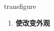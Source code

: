 
\begin{frame}
{\huge transfigure}
\begin{center}
\begin{enumerate}\Large
  \item \textbf{使改变外观}
\end{enumerate}
\end{center}
\end{frame}
